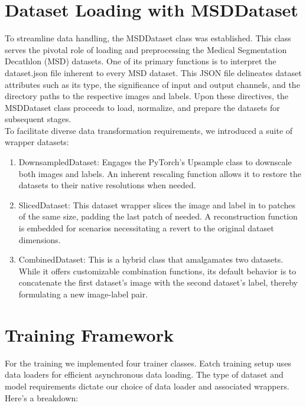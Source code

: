 \section{Dataset Loading with MSDDataset}
To streamline data handling, the MSDDataset class was established. This class serves the pivotal role of loading and preprocessing the Medical Segmentation Decathlon (MSD) datasets.
One of its primary functions is to interpret the dataset.json file inherent to every MSD dataset. This JSON file delineates dataset attributes such as its type, the significance of input and output channels,
and the directory paths to the respective images and labels. Upon these directives, the MSDDataset class proceeds to load, normalize, and prepare the datasets for subsequent stages.\\
To facilitate diverse data transformation requirements, we introduced a suite of wrapper datasets:
\begin{enumerate}
	\item DownsampledDataset: Engages the PyTorch's Upsample class to downscale both images and labels. An inherent rescaling function allows it to restore the datasets to their native resolutions when needed.
	\item SlicedDataset: This dataset wrapper slices the image and label in to patches of the same size, padding the last patch of needed.
	A reconstruction function is embedded for scenarios necessitating a revert to the original dataset dimensions.
	\item CombinedDataset: This is a hybrid class that amalgamates two datasets. While it offers customizable combination functions,
	its default behavior is to concatenate the first dataset's image with the second dataset's label, thereby formulating a new image-label pair.
\end{enumerate}

\section{Training Framework}
For the training we implemented four trainer classes. Eatch training setup uses data loaders for efficient asynchronous data loading.
The type of dataset and model requirements dictate our choice of data loader and associated wrappers. Here's a breakdown:

